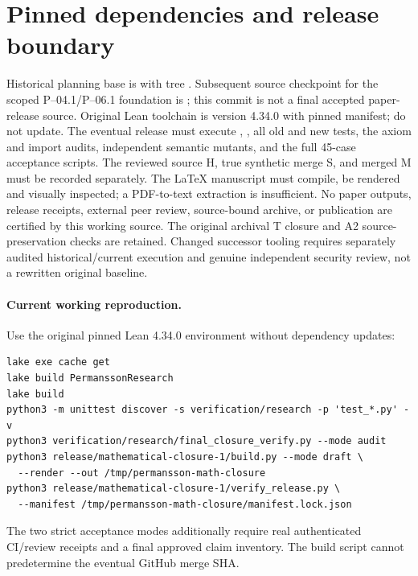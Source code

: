 \section{Pinned dependencies and release boundary}
Historical planning base is
with tree
.
Subsequent source checkpoint for the scoped P--04.1/P--06.1 foundation
is ; this commit
is not a final accepted paper-release source.
Original Lean toolchain is version 4.34.0 with pinned manifest;
do not update. The eventual release must execute
, ,
all old and new tests, the axiom and import audits, independent semantic
mutants, and the full 45-case acceptance scripts. The reviewed source
H, true synthetic merge S, and merged M must be recorded separately.
The LaTeX manuscript must compile, be rendered and visually inspected;
a PDF-to-text extraction is insufficient. No paper outputs, release
receipts, external peer review, source-bound archive, or publication
are certified by this working source. The original archival T closure
and A2 source-preservation checks are retained. Changed successor
tooling requires separately audited historical/current execution and
genuine independent security review, not a rewritten original baseline.


\paragraph{Current working reproduction.}
Use the original pinned Lean 4.34.0 environment without dependency updates:
\begin{verbatim}
lake exe cache get
lake build PermanssonResearch
lake build
python3 -m unittest discover -s verification/research -p 'test_*.py' -v
python3 verification/research/final_closure_verify.py --mode audit
python3 release/mathematical-closure-1/build.py --mode draft \
  --render --out /tmp/permansson-math-closure
python3 release/mathematical-closure-1/verify_release.py \
  --manifest /tmp/permansson-math-closure/manifest.lock.json
\end{verbatim}
The two strict acceptance modes additionally require real authenticated
CI/review receipts and a final approved claim inventory. The build
script cannot predetermine the eventual GitHub merge SHA.

